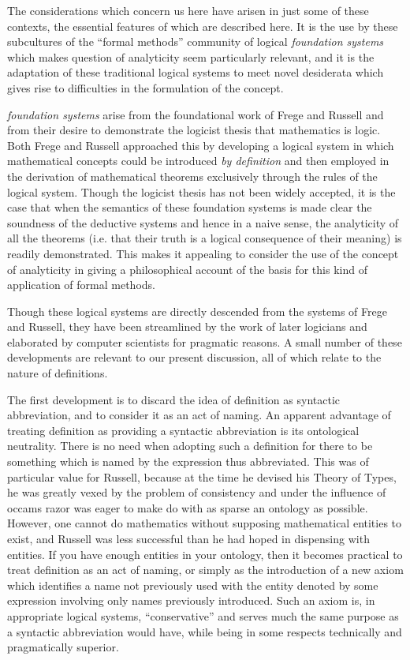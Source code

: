 \documentclass{rbjk}
\begin{document}
\begin{article}
The considerations which concern us here have arisen in just some of these contexts, the essential features of which are described here.
It is the use by these subcultures of the ``formal methods'' community of logical {\it foundation systems} which makes question of analyticity seem particularly relevant, and it is the adaptation of these traditional logical systems to meet novel desiderata which gives rise to difficulties in the formulation of the concept.

{\it foundation systems} arise from the foundational work of Frege and Russell and from their desire to demonstrate the logicist thesis that mathematics is logic.
Both Frege and Russell approached this by developing a logical system in which mathematical concepts could be introduced {\it by definition} and then employed in the derivation of mathematical theorems exclusively through the rules of the logical system.
Though the logicist thesis has not been widely accepted, it is the case that when the semantics of these foundation systems is made clear the soundness of the deductive systems and hence in a naive sense, the analyticity of all the theorems (i.e. that their truth is a logical consequence of their meaning) is readily demonstrated.
This makes it appealing to consider the use of the concept of analyticity in giving a philosophical account of the basis for this kind of application of formal methods.

Though these logical systems are directly descended from the systems of Frege and Russell, they have been streamlined by the work of later logicians and elaborated by computer scientists for pragmatic reasons.
A small number of these developments are relevant to our present discussion, all of which relate to the nature of definitions.

The first development is to discard the idea of definition as syntactic abbreviation, and to consider it as an act of naming.
An apparent advantage of treating definition as providing a syntactic abbreviation is its ontological neutrality.
There is no need when adopting such a definition for there to be something which is named by the expression thus abbreviated.
This was of particular value for Russell, because at the time he devised his Theory of Types, he was greatly vexed by the problem of consistency and under the influence of occams razor was eager to make do with as sparse an ontology as possible.
However, one cannot do mathematics without supposing mathematical entities to exist, and Russell was less successful than he had hoped in dispensing with entities.
If you have enough entities in your ontology, then it becomes practical to treat definition as an act of naming, or simply as the introduction of a new axiom which identifies a name not previously used with the entity denoted by some expression involving only names previously introduced.
Such an axiom is, in appropriate logical systems, ``conservative'' and serves much the same purpose as a syntactic abbreviation would have, while being in some respects technically and pragmatically superior.


\end{article}
\end{document}
